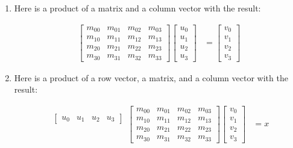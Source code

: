 \documentclass[oneside]{article}
\begin{document}
\begin{enumerate}
  \item Here is a product of a matrix and
      a column vector with the result:

  \begin{align*}
    \begin{bmatrix}
      m_{00} & m_{01} & m_{02} & m_{03} \\
      m_{10} & m_{11} & m_{12} & m_{13} \\
      m_{20} & m_{21} & m_{22} & m_{23} \\
      m_{30} & m_{31} & m_{32} & m_{33}
      \end{bmatrix}
    \begin{bmatrix}
      u_0 \\
      u_1 \\
      u_2 \\
      u_3
      \end{bmatrix}
    & =
    \begin{bmatrix}
      v_0 \\
      v_1 \\
      v_2 \\
      v_3
      \end{bmatrix}
    \end{align*}

  \item Here is a product of a row vector, a matrix, and a column
    vector with the result:

  \begin{align*}
    \begin{matrix}
    \begin{bmatrix}
        u_0 & u_1 & u_2 & u_3
        \end{bmatrix} \\
        \mbox{} \\
        \mbox{} \\
        \mbox{}
        \end{matrix}
    \begin{bmatrix}
      m_{00} & m_{01} & m_{02} & m_{03} \\
      m_{10} & m_{11} & m_{12} & m_{13} \\
      m_{20} & m_{21} & m_{22} & m_{23} \\
      m_{30} & m_{31} & m_{32} & m_{33}
      \end{bmatrix}
    \begin{bmatrix}
      v_0 \\
      v_1 \\
      v_2 \\
      v_3
      \end{bmatrix}
    & = x
    \end{align*}


\end{enumerate}
\end{document}
